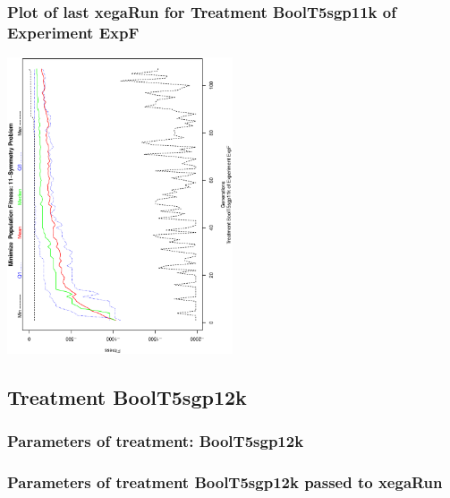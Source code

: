 \documentclass[18pt,c]{beamer}
\makeatletter
\def\beamer@writeslidentry@miniframesoff{%
  \expandafter\beamer@ifempty\expandafter{\beamer@framestartpage}{}%
  {%
   \clearpage\beamer@notesactions%
  }
}
\newcommand*{\miniframesoff}{\let\beamer@writeslidentry=\beamer@writeslidentry@miniframesoff}
\makeatother
\begin{document}
 \begin{frame}
 \frametitle{ Plot of last xegaRun for Treatment BoolT5sgp11k of Experiment ExpF }
 \begin{center}
\includegraphics[width=0.5\textwidth, angle=-90]
{ExpFPlotPopStatsFigure009.eps}
 \end{center}
 \label{report/ExpFPlotPopStatsFigure009.eps}  
 \end{frame}

\miniframesoff
\subsection{Treatment BoolT5sgp12k}

 \begin{frame}
 \fontsize{8pt}{9pt}\selectfont
 \frametitle{  Parameters of treatment: BoolT5sgp12k 
 }

 \label{ExpFtParmTable040.tex}  
 \end{frame}


 \begin{frame}
 \fontsize{8pt}{9pt}\selectfont
 \frametitle{  Parameters of treatment BoolT5sgp12k passed to xegaRun
 }

 \label{ExpFtParmTable041.tex}  
 \end{frame}
\end{document}
